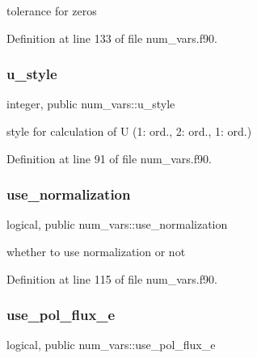 tolerance for zeros 



Definition at line 133 of file num\+\_\+vars.\+f90.

\mbox{\label{namespacenum__vars_a5b3a837df1e82bb43fc47815c62c6b49}} 
\subsubsection{\texorpdfstring{u\+\_\+style}{u\_style}}
{\footnotesize\ttfamily integer, public num\+\_\+vars\+::u\+\_\+style}



style for calculation of U (1\+: ord., 2\+: ord., 1\+: ord.) 



Definition at line 91 of file num\+\_\+vars.\+f90.

\mbox{\label{namespacenum__vars_a585ed16ea01f299cd764690f057af2c6}} 
\subsubsection{\texorpdfstring{use\+\_\+normalization}{use\_normalization}}
{\footnotesize\ttfamily logical, public num\+\_\+vars\+::use\+\_\+normalization}



whether to use normalization or not 



Definition at line 115 of file num\+\_\+vars.\+f90.

\mbox{\label{namespacenum__vars_adedd3c1e77cfdf75dac84e43ee54497a}} 
\subsubsection{\texorpdfstring{use\+\_\+pol\+\_\+flux\+\_\+e}{use\_pol\_flux\_e}}
{\footnotesize\ttfamily logical, public num\+\_\+vars\+::use\+\_\+pol\+\_\+flux\+\_\+e}



